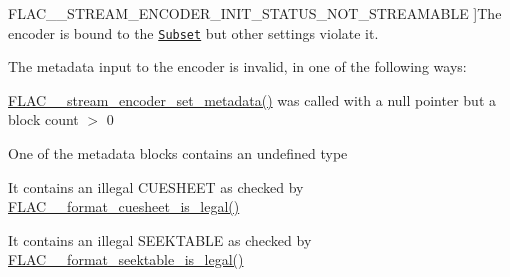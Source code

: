 \begin{Desc}
\begin{description}
{F\+L\+A\+C\+\_\+\+\_\+\+S\+T\+R\+E\+A\+M\+\_\+\+E\+N\+C\+O\+D\+E\+R\+\_\+\+I\+N\+I\+T\+\_\+\+S\+T\+A\+T\+U\+S\+\_\+\+N\+O\+T\+\_\+\+S\+T\+R\+E\+A\+M\+A\+B\+LE\hypertarget{group__flac__stream__encoder_gga3bb869620af2b188d77982a5c30b047daa793405c858c7606539082750080a47e}{}\label{group__flac__stream__encoder_gga3bb869620af2b188d77982a5c30b047daa793405c858c7606539082750080a47e}
}]The encoder is bound to the \href{../format.html#subset}{\tt Subset} but other settings violate it. \item[{\em 
F\+L\+A\+C\+\_\+\+\_\+\+S\+T\+R\+E\+A\+M\+\_\+\+E\+N\+C\+O\+D\+E\+R\+\_\+\+I\+N\+I\+T\+\_\+\+S\+T\+A\+T\+U\+S\+\_\+\+I\+N\+V\+A\+L\+I\+D\+\_\+\+M\+E\+T\+A\+D\+A\+TA\hypertarget{group__flac__stream__encoder_gga3bb869620af2b188d77982a5c30b047daa85afdd1849c75a19594416cef63e3e9}{}\label{group__flac__stream__encoder_gga3bb869620af2b188d77982a5c30b047daa85afdd1849c75a19594416cef63e3e9}
}]The metadata input to the encoder is invalid, in one of the following ways\+:
\begin{DoxyItemize}
\item \hyperlink{group__flac__stream__encoder_ga67b30b1a67a9274f7708a22154b225f6}{F\+L\+A\+C\+\_\+\+\_\+stream\+\_\+encoder\+\_\+set\+\_\+metadata()} was called with a null pointer but a block count $>$ 0
\item One of the metadata blocks contains an undefined type
\item It contains an illegal C\+U\+E\+S\+H\+E\+ET as checked by \hyperlink{group__flac__format_gae922cabe2dc3f81af10cb635cf996114}{F\+L\+A\+C\+\_\+\+\_\+format\+\_\+cuesheet\+\_\+is\+\_\+legal()}
\item It contains an illegal S\+E\+E\+K\+T\+A\+B\+LE as checked by \hyperlink{group__flac__format_ga02270d9b92dbe7617635c65a1d0f58ff}{F\+L\+A\+C\+\_\+\+\_\+format\+\_\+seektable\+\_\+is\+\_\+legal()}

\end{DoxyItemize}
\end{description}
\end{Desc}
